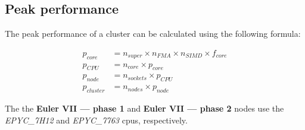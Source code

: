\documentclass[unicode,11pt,a4paper,oneside,numbers=endperiod,openany]{scrartcl}
\begin{document}
\subsection{Peak performance}

The peak performance of a cluster can be calculated using the following formula:


\begin{align*}
    p_{core}    & = n_{super} \times n_{FMA} \times n_{SIMD} \times f_{core} \\
    p_{CPU}     & = n_{core} \times p_{core}                                 \\
    p_{node}    & = n_{sockets} \times p_{CPU}                               \\
    p_{cluster} & = n_{nodes} \times p_{node}
\end{align*}

The the \textbf{Euler VII — phase 1} and \textbf{Euler VII — phase 2} nodes use the \textit{EPYC\_7H12} and \textit{EPYC\_7763} cpus, respectively.
\end{document}
